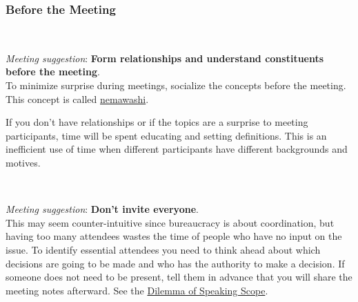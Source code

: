 
\subsubsection*{Before the Meeting}

\ \\
\begin{samepage}
\textit{Meeting suggestion}: \textbf{Form relationships and understand constituents before the meeting}.\\
To minimize surprise during meetings, socialize the concepts before the meeting. This concept is called 
\href{https://en.wikipedia.org/wiki/Nemawashi}{nemawashi}.
\iftoggle{WPinmargin}{\marginpar{$>$Wikipedia: Nemawashi}}{}
\end{samepage}

If you don't have relationships or if the topics are a surprise to meeting participants, time will be spent educating and setting definitions. This is an inefficient use of time when different participants have different backgrounds and motives.

\ \\
\begin{samepage}
\textit{Meeting suggestion}: \textbf{Don't invite everyone}.\\
This may seem counter-intuitive since bureaucracy is about coordination, but having too many attendees wastes the time of people who have no input on the issue. 
To identify essential attendees you need to think ahead about which decisions are going to be made and who has the authority to make a decision. If someone does not need to be present, tell them in advance that you will share the meeting notes afterward. See the \hyperref[table:dilemma-personal-scope-of-speaking]{Dilemma of Speaking Scope}.
\end{samepage}

